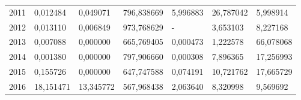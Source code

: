 \begin{table}
\begin{tabular}{p{1cm}p{2cm}p{2cm}p{2cm}p{2cm}p{2cm}p{2cm}}
 2011 &     0,012484 &          0,049071 &  796,838669 &                   5,996883 &                           26,787042 &                       5,998914 \\
 2012 &     0,013110 &          0,006849 &  973,768629 &                          - &                            3,653103 &                       8,227168 \\
 2013 &     0,007088 &          0,000000 &  665,769405 &                   0,000473 &                            1,222578 &                      66,078068 \\
 2014 &     0,001380 &          0,000000 &  797,906660 &                   0,000308 &                            7,896365 &                      17,256993 \\
 2015 &     0,155726 &          0,000000 &  647,747588 &                   0,074191 &                           10,721762 &                      17,665729 \\
 2016 &    18,151471 &         13,345772 &  567,968438 &                   2,063640 &                            8,320998 &                       9,569692 \\
\bottomrule
\end{tabular}
\end{table}
